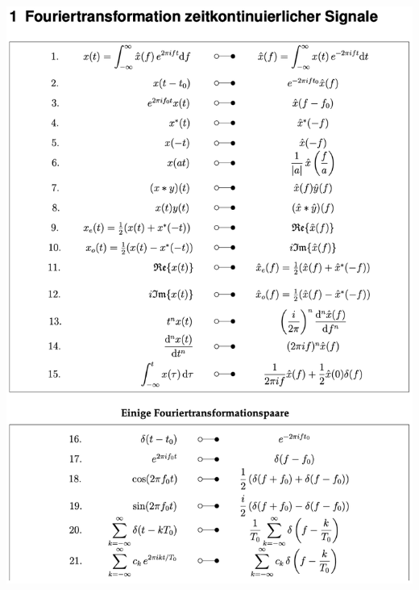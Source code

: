 \documentclass[11pt]{article}
\begin{document}
\begin{center}
    \includegraphics[width=0.85\linewidth]{docimgs/fs1.png}
\end{center}

\pagebreak
\end{document}
